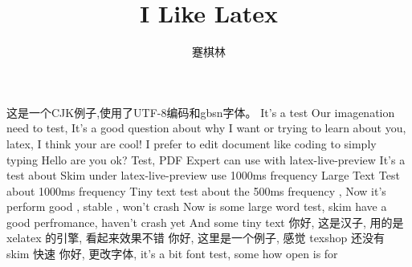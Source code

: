 \documentclass{article}
\title{I Like Latex}
\author{蹇棋林}
\begin{document}
\maketitle
这是一个CJK例子,使用了UTF-8编码和gbsn字体。
It's a test
Our imagenation need to test,
\Large It's a good question about why I want or trying to learn about you, latex, I think your are cool! I prefer to edit document like coding to simply typing
\tiny Hello are you ok?
\Large Test, PDF Expert can use with latex-live-preview
\tiny It's a test about Skim under latex-live-preview use 1000ms frequency
\Large Large Text Test about 1000ms frequency
\tiny Tiny text test about the 500ms frequency , Now it's perform good , stable , won't crash
\Large Now is some large word test, skim have a good perfromance, haven't crash yet
\tiny And some tiny text
\Large 你好, 这是汉子, 用的是 xelatex 的引擎, 看起来效果不错
\Large 你好, 这里是一个例子, 感觉 texshop 还没有 skim 快速
\tiny 你好, 更改字体, 
\Large it's a bit font test, some how open is for
\end{document}
